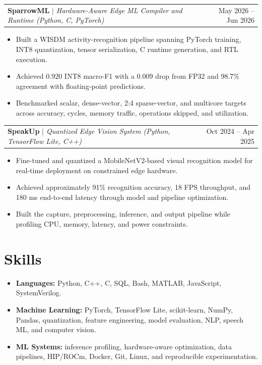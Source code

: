 \documentclass[10pt,letterpaper]{article}
\newcommand{\resumeItem}[1]{\item #1}
\newcommand{\resumeProjectHeading}[3]{\begin{tabularx}{\textwidth}{X r}\textbf{#1} \textit{#2} & #3 \\\end{tabularx}\vspace{0pt}}
\newenvironment{resumeItemList}{\begin{small}\begin{itemize}[leftmargin=*, itemsep=2pt, topsep=3pt, parsep=0pt]}{\end{itemize}\end{small}\vspace{4pt}}
\begin{document}
\resumeProjectHeading{SparrowML}{$\mid$ Hardware-Aware Edge ML Compiler and Runtime (Python, C, PyTorch)}{May 2026 -- Jun 2026}
\begin{resumeItemList}
    \resumeItem{Built a WISDM activity-recognition pipeline spanning PyTorch training, INT8 quantization, tensor serialization, C runtime generation, and RTL execution.}
    \resumeItem{Achieved 0.920 INT8 macro-F1 with a 0.009 drop from FP32 and 98.7\% agreement with floating-point predictions.}
    \resumeItem{Benchmarked scalar, dense-vector, 2:4 sparse-vector, and multicore targets across accuracy, cycles, memory traffic, operations skipped, and utilization.}
\end{resumeItemList}

\resumeProjectHeading{SpeakUp}{$\mid$ Quantized Edge Vision System (Python, TensorFlow Lite, C++)}{Oct 2024 -- Apr 2025}
\begin{resumeItemList}
    \resumeItem{Fine-tuned and quantized a MobileNetV2-based visual recognition model for real-time deployment on constrained edge hardware.}
    \resumeItem{Achieved approximately 91\% recognition accuracy, 18 FPS throughput, and 180 ms end-to-end latency through model and pipeline optimization.}
    \resumeItem{Built the capture, preprocessing, inference, and output pipeline while profiling CPU, memory, latency, and power constraints.}
\end{resumeItemList}

\vspace{-0.5em}
\section*{Skills}
\begin{resumeItemList}
    \resumeItem{\textbf{Languages:} Python, C++, C, SQL, Bash, MATLAB, JavaScript, SystemVerilog.}
    \resumeItem{\textbf{Machine Learning:} PyTorch, TensorFlow Lite, scikit-learn, NumPy, Pandas, quantization, feature engineering, model evaluation, NLP, speech ML, and computer vision.}
    \resumeItem{\textbf{ML Systems:} inference profiling, hardware-aware optimization, data pipelines, HIP/ROCm, Docker, Git, Linux, and reproducible experimentation.}
\end{resumeItemList}
\end{document}
